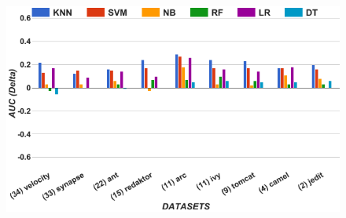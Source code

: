 \newcommand\fnote[1]{\captionsetup{font=small}\caption*{#1}}

\begin{figure}[!t]
\begin{minipage}{.5\linewidth}
\centering
        \includegraphics[width=.95\linewidth]{./fig/AUC_untuned.png}
        

\end{minipage}
\end{figure}
